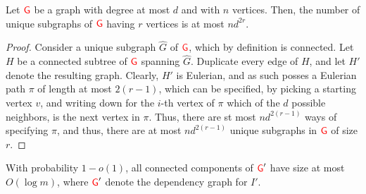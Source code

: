\begin{lemma}
    Let ${\textcolor{red}{\mathsf{G}}}$ be a graph with degree at most $d$ and with $n$
    vertices. Then, the number of unique subgraphs of ${\textcolor{red}{\mathsf{G}}}$ having
    $r$ vertices is at most $nd^{2r}$.
\end{lemma}

\begin{proof}
    Consider a unique subgraph $\widehat{G}$ of ${\textcolor{red}{\mathsf{G}}}$, which by
    definition is connected.  Let $H$ be a connected subtree of ${\textcolor{red}{\mathsf{G}}}$
    spanning $\widehat{G}$. Duplicate every edge of $H$, and let $H'$
    denote the resulting graph. Clearly, $H'$ is Eulerian, and as such
    posses a Eulerian path $\pi$ of length at most $2(r-1)$, which can
    be specified, by picking a starting vertex $v$, and writing down
    for the $i$-th vertex of $\pi$ which of the $d$ possible
    neighbors, is the next vertex in $\pi$.  Thus, there are st most
    $nd^{2(r-1)}$ ways of specifying $\pi$, and thus, there are at
    most $nd^{2(r-1)}$ unique subgraphs in ${\textcolor{red}{\mathsf{G}}}$ of size $r$.
\end{proof}

\begin{lemma}
    With probability $1- o(1)$, all connected components of ${\textcolor{red}{\mathsf{G}}}'$ have
    size at most $O( \log{m})$, where ${\textcolor{red}{\mathsf{G}}}'$ denote the dependency graph
    for $I'$. 
\end{lemma}


